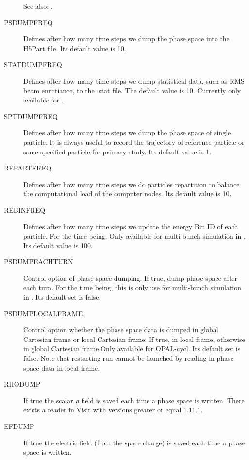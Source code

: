 \begin{description}
  See also: .
\item[PSDUMPFREQ]
   Defines after how many time steps we dump the phase space into the H5Part file. Its default value is 10. 
\item[STATDUMPFREQ]
 	Defines after how many time steps we dump statistical data, such as RMS beam emittiance, to the .stat file.
 	The default value is 10. Currently only available for \opalt.
\item[SPTDUMPFREQ]
   Defines after how many time steps we dump the phase space of single particle.
   It is always useful to record the trajectory of reference particle
   or some specified particle for primary study. Its default value is 1.  
\item[REPARTFREQ]
   Defines after how many time steps we do particles repartition to balance the computational load of  
   the computer nodes. Its default value is 10.  
   
\item[REBINFREQ]
   Defines after how many time steps we update the energy Bin ID of each particle. For the time being. 
   Only available for multi-bunch simulation in \opalcycl. Its default value is 100.  

\item[PSDUMPEACHTURN]
 Control option of phase space dumping. If true, dump phase space after each turn. 
 For the time being, this is only use for multi-bunch simulation in \opalcycl. Its default set is false. 

\item[PSDUMPLOCALFRAME]
 Control option whether the phase space data is dumped in global Cartesian frame or local Cartesian frame.
 If true, in local frame, otherwise in global Cartesian frame.Only available for OPAL-cycl. Its default set is false.
 Note that restarting run cannot be launched by reading in phase space data in local frame.

\item[RHODUMP]
 If true the scalar $\rho$ field is saved each time a phase space is written. There exists a reader in Visit with versions 
 greater or equal 1.11.1.

\item[EFDUMP]
 If true the electric field (from the space charge) is saved each time a phase space is written. 
\end{description}


